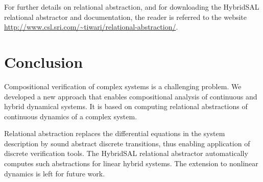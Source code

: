 \documentclass{article}
\begin{document}
For further details on relational abstraction, and for downloading
the HybridSAL relational abstractor and documentation, the reader
is referred to the website
{{\url{http://www.csl.sri.com/~tiwari/relational-abstraction/}}}.


\section{Conclusion}

Compositional verification of complex systems is a
challenging problem.  We developed a new approach
that enables compositional analysis of continuous and
hybrid dynamical systems.  It is based on computing 
relational abstractions of continuous dynamics of
a complex system.

Relational abstraction replaces the differential equations 
in the system description by sound abstract discrete 
transitions, thus enabling application of discrete verification 
tools. The HybridSAL relational abstractor automatically 
computes such abstractions for linear hybrid systems. 
The extension to nonlinear dynamics is left for future
work.




%
%
%
%
%
\end{document}
